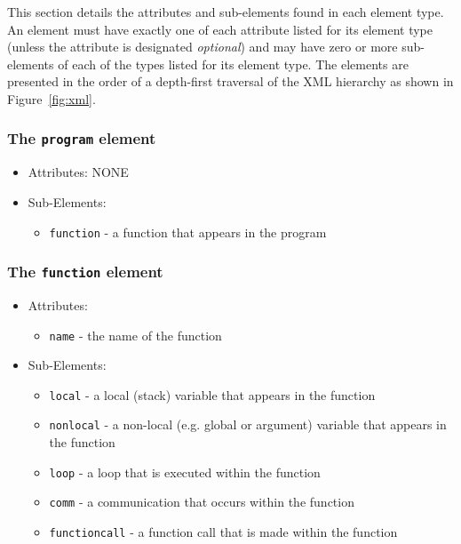 \documentclass{article}
\begin{document}
This section details the attributes and sub-elements found in each
element type.  An element must have exactly one of each attribute listed
for its element type (unless the attribute is designated {\it optional})
and may have zero or more sub-elements of each of the types listed for its
element type.  The elements are presented in the order of a depth-first
traversal of the XML hierarchy as shown in Figure~\ref{fig:xml}.

\subsubsection{The {\tt program} element}
  \begin{itemize}
    \item Attributes: NONE
    \item Sub-Elements:
    \begin{itemize}
      \item {\tt function} - a function that appears in the program
    \end{itemize}
  \end{itemize}

\subsubsection{The {\tt function} element}
  \begin{itemize}
    \item Attributes:
    \begin{itemize}
      \item {\tt name} - the name of the function
    \end{itemize}
    \item Sub-Elements:
    \begin{itemize}
      \item {\tt local} - a local (stack) variable that appears in
        the function
      \item {\tt nonlocal} - a non-local (e.g. global or argument)
        variable that appears in the function
      \item {\tt loop} - a loop that is executed within the function
      \item {\tt comm} - a communication that occurs within the function
      \item {\tt functioncall} - a function call that is made within
        the function
    \end{itemize}
  \end{itemize}
\end{document}
